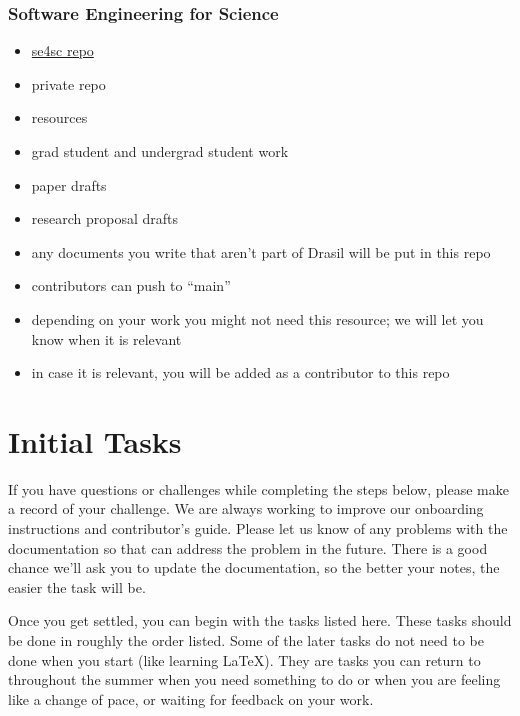 \documentclass[12pt]{article}
\begin{document}
\subsubsection{Software Engineering for Science}
\begin{itemize}
\item \href{https://gitlab.cas.mcmaster.ca/SEforSC/se4sc} {se4sc repo}
\item private repo
\item resources 
\item grad student and undergrad student work
\item paper drafts
\item research proposal drafts
\item any documents you write that aren't part of Drasil will be put in this repo
\item contributors can push to ``main''
\item depending on your work you might not need this resource; we will let you
know when it is relevant
\item in case it is relevant, you will be added as a contributor to this repo
\end{itemize}

\section{Initial Tasks} \label{SecInitialTasks}

If you have questions or challenges while completing the steps below, please
make a record of your challenge.  We are always working to improve our
onboarding instructions and contributor's guide.  Please let us know of any
problems with the documentation so that can address the problem in the future.
There is a good chance we'll ask you to update the documentation, so the better
your notes, the easier the task will be.

Once you get settled, you can begin with the tasks listed here.  These tasks
should be done in roughly the order listed.  Some of the later tasks do not need
to be done when you start (like learning LaTeX).  They are tasks you can return
to throughout the summer when you need something to do or when you are feeling
like a change of pace, or waiting for feedback on your work.
\end{document}
